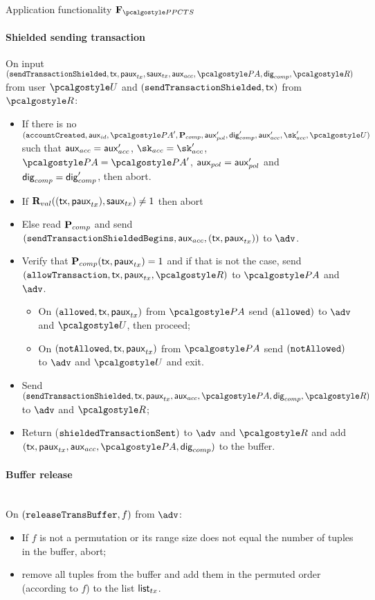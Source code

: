 \documentclass[runningheads,10pt]{llncs}
\numberwithin{equation}{section}
\begin{document}
\begin{funcbox}{Application functionality $\func{\PPCTS}$}
  \paragraph{Shielded sending transaction} On input
  $(\sendTransactionShielded, \tx, \pauxtx, \sauxtx, \auxacc, \polas, \policydig, \relay)$ from
  user $\user$ and $(\mathtt{sendTransactionShielded}, \mathsf{tx})$ from $\relay$:
  \begin{itemize}
  \item If there is no $(\accountCreated, \auxid, \polas', \comppolicy,
    \auxpol', \policydig', \auxacc', \skacc', \user)$ such that $\mathsf{aux}_{acc} =
    \mathsf{aux}_{acc}'$, $\skacc = \skacc'$, $\polas = \polas'$, $\mathsf{aux}_{pol} = \mathsf{aux}_{pol}'$ and
    $\mathsf{dig}_{comp} = \mathsf{dig}_{comp}'$, then  abort.
  \item If $\mathbf{R}_{val}((\mathsf{tx}, \mathsf{paux}_{tx}), \mathsf{saux}_{tx}) \neq 1$ then abort
  \item Else read $\mathbf{P}_{comp}$ and send $(\mathtt{sendTransactionShieldedBegins}, \mathsf{aux}_{acc},
    (\mathsf{tx}, \mathsf{paux}_{tx}))$ to $\adv$.
  \item Verify that $\mathbf{P}_{comp}(\mathsf{tx}, \mathsf{paux}_{tx}) = 1$ and if that is not the
    case, send $(\allowTransaction, \tx, \pauxtx, \relay)$ to $\polas$ and $\adv$. 
    \begin{itemize}
    \item On $(\mathtt{allowed}, \mathsf{tx}, \mathsf{paux}_{tx})$ from $\polas$ send $(\mathtt{allowed})$ to
      $\adv$ and $\user$, then proceed;
    \item On $(\mathtt{notAllowed}, \mathsf{tx}, \mathsf{paux}_{tx})$ from $\polas$ send $(\mathtt{notAllowed})$
      to $\adv$ and $\user$ and exit.
    \end{itemize}
  \item Send $(\sendTransactionShielded, \tx, \pauxtx, \auxacc, \polas, \policydig,
    \relay)$ to $\adv$ and $\relay$;
  \item Return ($\mathtt{shieldedTransactionSent})$ to $\adv$ and $\relay$ and add $(\tx,
    \paux_{tx}, \auxacc, \polas, \policydig)$ to the buffer.
  \end{itemize}

  \paragraph{Buffer release}  \\
  On $(\mathtt{releaseTransBuffer}, f)$ from $\adv$:
  \begin{itemize}
  \item If $f$ is not a permutation or its range size does not equal the number
    of tuples in the buffer, abort;
  \item remove all tuples from the buffer and add them in the permuted
    order (according to $f$) to the list ${\mathsf{list}_{tx}}$.
  \end{itemize}


\end{funcbox}
\end{document}
